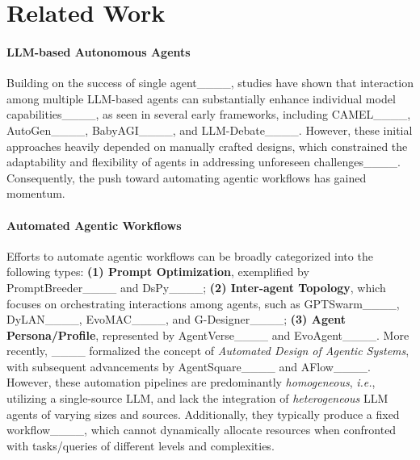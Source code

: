 \section{Related Work}
\vspace{-0.5em}
\paragraph{LLM-based Autonomous Agents}
Building on the success of single agent____, studies have shown that interaction among multiple LLM-based agents can substantially enhance individual model capabilities____, as seen in several early frameworks, including CAMEL____, AutoGen____, BabyAGI____, and LLM-Debate____. However, these initial approaches heavily depended on manually crafted designs, which constrained the adaptability and flexibility of agents in addressing unforeseen challenges____. Consequently, the push toward automating agentic workflows has gained momentum.

\vspace{-0.7em}
\paragraph{Automated Agentic Workflows}
Efforts to automate agentic workflows can be broadly categorized into the following types: \textbf{(1) Prompt Optimization}, exemplified by PromptBreeder____ and DsPy____; \textbf{(2) Inter-agent Topology}, which focuses on orchestrating interactions among agents, such as GPTSwarm____, DyLAN____, EvoMAC____, and G-Designer____; \textbf{(3) Agent Persona/Profile}, represented by AgentVerse____ and EvoAgent____. More recently, ____ formalized the concept of \textit{Automated Design of Agentic Systems}, with subsequent advancements by AgentSquare____ and AFlow____. However, these automation pipelines are predominantly \textit{homogeneous}, \textit{i.e.}, utilizing a single-source LLM, and lack the integration of \textit{heterogeneous} LLM agents of varying sizes and sources. Additionally, they typically produce a fixed workflow____, which cannot dynamically allocate resources when confronted with tasks/queries of different levels and complexities.

